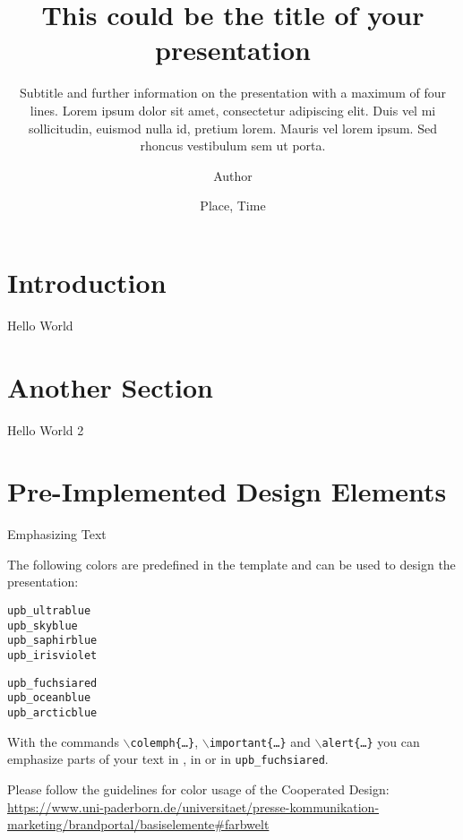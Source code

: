 \documentclass[
	aspectratio=169
	] {beamer}
\title[Shorttitle]{This could be the title of your presentation\-}
\subtitle{Subtitle and further information on the presentation with a maximum of four lines. Lorem ipsum dolor sit amet, consectetur adipiscing elit. Duis vel mi sollicitudin, euismod nulla id, pretium lorem. Mauris vel lorem ipsum. Sed rhoncus vestibulum sem ut porta. }
\author{Author}
\date{Place, Time}
\begin{document}
	\begin{frame}[plain]
		\titlepage
	\end{frame}

\maketocframe

\section{Introduction}
\begin{frame}{Hello World}
	\blindtext
\end{frame}

\section{Another Section}
\begin{frame}{Hello World 2}
	\blindtext
\end{frame}

\section{Pre-Implemented Design Elements}
\begin{frame}{Emphasizing Text}
\small
\begin{minipage}{.46\linewidth}
The following colors are predefined in the template and can be used to design the presentation:\\


\begin{minipage}{.49\linewidth}
\texttt{\color{upb_ultrablue}upb\_ultrablue}\\
\texttt{\color{upb_skyblue}upb\_skyblue}\\
\texttt{\color{upb_saphirblue}upb\_saphirblue}\\
\texttt{\color{upb_irisviolet}upb\_irisviolet}\\
\end{minipage}
\begin{minipage}{.49\linewidth}
\texttt{\color{upb_fuchsiared}upb\_fuchsiared}\\
\texttt{\color{upb_oceanblue}upb\_oceanblue}\\
\texttt{\color{upb_arcticblue}upb\_arcticblue}
\end{minipage}


\end{minipage}
\hfill
\begin{minipage}{.4\linewidth}
	With the commands \texttt{$\backslash$colemph\{\ldots\}},
	\texttt{$\backslash$important\{\ldots\}} and \texttt{$\backslash$alert\{\ldots\}} you can emphasize parts of your text
	in , in  or in \alert{\texttt{upb\_fuchsiared}}.
\end{minipage}


\footnotesize
Please follow the guidelines for color usage of the Cooperated Design:\\
\url{https://www.uni-paderborn.de/universitaet/presse-kommunikation-marketing/brandportal/basiselemente\#farbwelt}
\end{frame}
\end{document}
